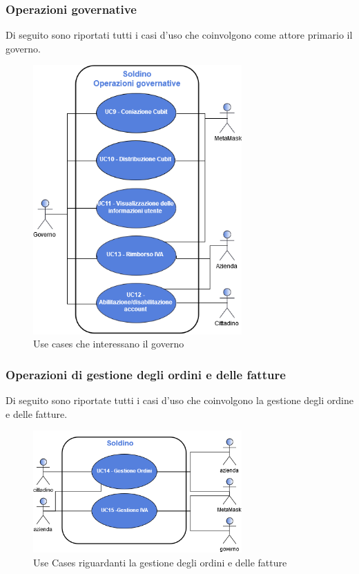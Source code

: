 \subsubsection*{Operazioni governative}
Di seguito sono riportati tutti i casi d'uso che coinvolgono come attore primario il governo.

\begin{figure}[H]
	\includegraphics[width=8cm]{res/images/UseCaseGoverno.png}
	\centering
	\caption{Use cases che interessano il governo}
\end{figure}



\subsubsection*{Operazioni di gestione degli ordini e delle fatture}
Di seguito sono riportate tutti i casi d'uso che coinvolgono la gestione degli ordine e delle fatture.

\begin{figure}[H]
	\includegraphics[width=8cm]{res/images/UseCaseFinali.png}
	\centering
	\caption{Use Cases riguardanti la gestione degli ordini e delle fatture}
\end{figure}




